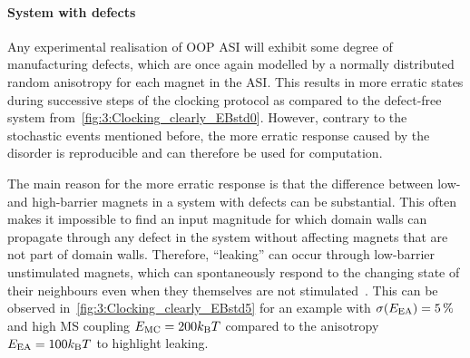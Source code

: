 \paragraph{System with defects}
Any experimental realisation of OOP ASI will exhibit some degree of manufacturing defects, which are once again modelled by a normally distributed random anisotropy for each magnet in the ASI.
This results in more erratic states during successive steps of the clocking protocol as compared to the defect-free system from~\cref{fig:3:Clocking_clearly_EBstd0}.
However, contrary to the stochastic events mentioned before, the more erratic response caused by the disorder is reproducible and can therefore be used for computation. \par
The main reason for the more erratic response is that the difference between low- and high-barrier magnets in a system with defects can be substantial.
This often makes it impossible to find an input magnitude for which domain walls can propagate through any defect in the system without affecting magnets that are not part of domain walls.
Therefore, ``leaking'' can occur through low-barrier unstimulated magnets, which can spontaneously respond to the changing state of their neighbours even when they themselves are not stimulated~\cite{DisorderGroundStateASI}. %
This can be observed in~\cref{fig:3:Clocking_clearly_EBstd5} for an example with $\sigma(E_\mathrm{EA}) = \SI{5}{\percent}$ and high MS coupling $\EMC = 200 \kBT$ compared to the anisotropy $\EEA = 100 \kBT$ to highlight leaking.


